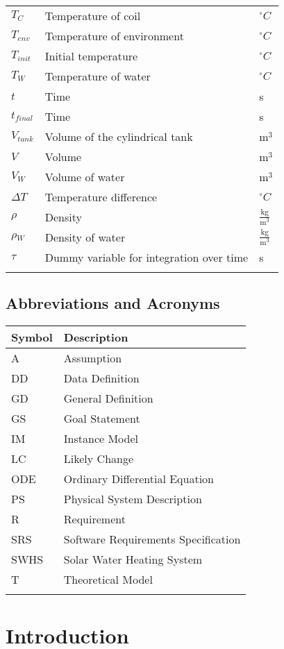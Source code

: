 \documentclass[12pt]{article}
\begin{document}
\begin{longtable*}{l l l}
$T_{C}$ & Temperature of coil & ${}^{\circ}C$
\\
$T_{env}$ & Temperature of environment & ${}^{\circ}C$
\\
$T_{init}$ & Initial temperature & ${}^{\circ}C$
\\
$T_{W}$ & Temperature of water & ${}^{\circ}C$
\\
$t$ & Time & s
\\
$t_{final}$ & Time & s
\\
$V_{tank}$ & Volume of the cylindrical tank & $\text{m}^{3}$
\\
$V$ & Volume & $\text{m}^{3}$
\\
$V_{W}$ & Volume of water & $\text{m}^{3}$
\\
$\Delta{}T$ & Temperature difference & ${}^{\circ}C$
\\
$\rho{}$ & Density & $\frac{\text{kg}}{\text{m}^{3}}$
\\
$\rho{}_{W}$ & Density of water & $\frac{\text{kg}}{\text{m}^{3}}$
\\
$\tau{}$ & Dummy variable for integration over time & s
\\
\bottomrule
\label{Table:TablofSymb}
\end{longtable*}
\subsection{Abbreviations and Acronyms}
\label{Sec:AbbrandAcro}
\begin{longtable*}{l l}
\toprule
Symbol & Description
\\
\midrule
A & Assumption
\\
DD & Data Definition
\\
GD & General Definition
\\
GS & Goal Statement
\\
IM & Instance Model
\\
LC & Likely Change
\\
ODE & Ordinary Differential Equation
\\
PS & Physical System Description
\\
R & Requirement
\\
SRS & Software Requirements Specification
\\
SWHS & Solar Water Heating System
\\
T & Theoretical Model
\\
\bottomrule
\label{Table:AbbrandAcro}
\end{longtable*}
\section{Introduction}
\label{Sec:Intr}
\end{document}
